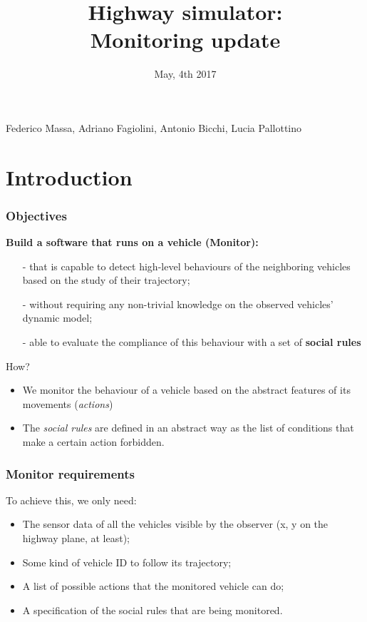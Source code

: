 \documentclass{beamer}
\title{Highway simulator: \\
Monitoring update}
\date{\small May, 4th 2017}
\begin{document}

{
\begin{frame}
\titlepage
\bigskip
\medskip
\centering\small Federico Massa, Adriano Fagiolini, Antonio Bicchi, Lucia Pallottino
\end{frame}}
\addtocounter{framenumber}{-1}

\section{Introduction}

\begin{frame}
\frametitle{Objectives}

\textbf{Build a software that runs on a vehicle ({\color{dred}Monitor}):}

\begin{itemize}
\item[-] that is capable to detect high-level behaviours of the neighboring vehicles based on the study of their trajectory;
\item[-] without requiring any non-trivial knowledge on the observed vehicles' dynamic model;
\item[-] able to evaluate the compliance of this behaviour with a set of
\textbf{social rules}
\end{itemize}

How?\\

\begin{itemize}
	\item We monitor the behaviour of a vehicle based on the
		  abstract features of its movements (\emph{actions})
  	\item The \emph{social rules} 
  		  are defined in an abstract way as the list of
  		  conditions that make a certain action forbidden.
\end{itemize}
\end{frame}

\begin{frame}
\frametitle{Monitor requirements}

To achieve this, we only need:
\begin{itemize}
\item The sensor data of all the vehicles visible by the observer (x, y 
      on the highway plane, at least);
\item Some kind of vehicle ID to 
      follow its trajectory;
\item A list of possible actions that the monitored vehicle can do;
\item A specification of the social rules that are being monitored.
\end{itemize}

\end{frame}
\end{document}
